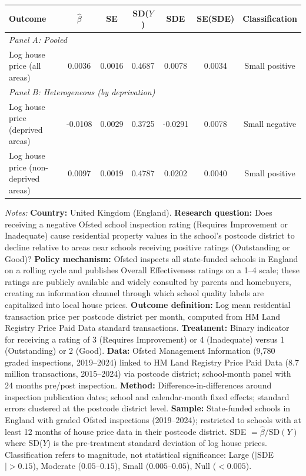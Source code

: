 \begin{tabular}{lcccccc}
\toprule
Outcome & $\hat{\beta}$ & SE & SD($Y$) & SDE & SE(SDE) & Classification \\
\midrule
\multicolumn{7}{l}{\textit{Panel A: Pooled}} \\[3pt]
Log house price (all areas) & 0.0036 & 0.0016 & 0.4687 & 0.0078 & 0.0034 & Small positive \\
\midrule
\multicolumn{7}{l}{\textit{Panel B: Heterogeneous (by deprivation)}} \\[3pt]
Log house price (deprived areas) & -0.0108 & 0.0029 & 0.3725 & -0.0291 & 0.0078 & Small negative \\
Log house price (non-deprived areas) & 0.0097 & 0.0019 & 0.4787 & 0.0202 & 0.0040 & Small positive \\
\bottomrule
\end{tabular}
\par\vspace{0.3em}
{\footnotesize \textit{Notes:} \textbf{Country:} United Kingdom (England). \textbf{Research question:} Does receiving a negative Ofsted school inspection rating (Requires Improvement or Inadequate) cause residential property values in the school's postcode district to decline relative to areas near schools receiving positive ratings (Outstanding or Good)? \textbf{Policy mechanism:} Ofsted inspects all state-funded schools in England on a rolling cycle and publishes Overall Effectiveness ratings on a 1--4 scale; these ratings are publicly available and widely consulted by parents and homebuyers, creating an information channel through which school quality labels are capitalized into local house prices. \textbf{Outcome definition:} Log mean residential transaction price per postcode district per month, computed from HM Land Registry Price Paid Data standard transactions. \textbf{Treatment:} Binary indicator for receiving a rating of 3 (Requires Improvement) or 4 (Inadequate) versus 1 (Outstanding) or 2 (Good). \textbf{Data:} Ofsted Management Information (9,780 graded inspections, 2019--2024) linked to HM Land Registry Price Paid Data (8.7 million transactions, 2015--2024) via postcode district; school-month panel with 24 months pre/post inspection. \textbf{Method:} Difference-in-differences around inspection publication dates; school and calendar-month fixed effects; standard errors clustered at the postcode district level. \textbf{Sample:} State-funded schools in England with graded Ofsted inspections (2019--2024); restricted to schools with at least 12 months of house price data in their postcode district. SDE $= \hat{\beta} / \text{SD}(Y)$ where SD($Y$) is the pre-treatment standard deviation of log house prices. Classification refers to magnitude, not statistical significance: Large ($|$SDE$| > 0.15$), Moderate ($0.05$--$0.15$), Small ($0.005$--$0.05$), Null ($< 0.005$).}
